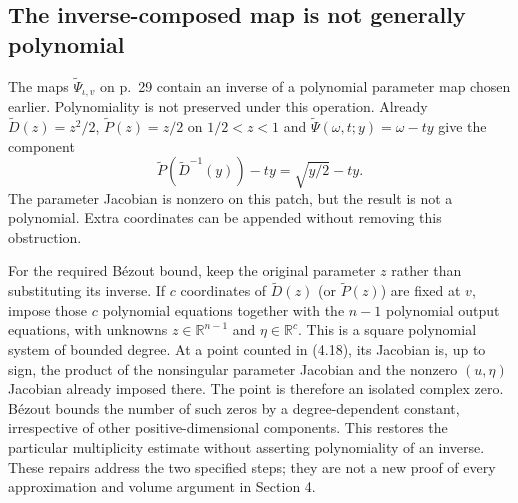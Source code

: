 \documentclass[10pt]{article}
\begin{document}
\subsection*{The inverse-composed map is not generally polynomial}
The maps \(\widetilde\Psi_{\iota,v}\) on p. 29 contain an inverse of a polynomial parameter map chosen earlier. Polynomiality is not preserved under this operation. Already \(\widetilde D(z)=z^2/2\), \(\widetilde P(z)=z/2\) on \(1/2<z<1\) and \(\widetilde\Psi(\omega,t;y)=\omega-ty\) give the component \[\widetilde P(\widetilde D^{-1}(y))-ty
 =\sqrt{y/2}-ty .\] The parameter Jacobian is nonzero on this patch, but the result is not a polynomial. Extra coordinates can be appended without removing this obstruction.\par
For the required Bézout bound, keep the original parameter \(z\) rather than substituting its inverse. If \(c\) coordinates of \(\widetilde D(z)\) (or \(\widetilde P(z)\)) are fixed at \(v\), impose those \(c\) polynomial equations together with the \(n-1\) polynomial output equations, with unknowns \(z\in\mathbb R^{n-1}\) and \(\eta\in\mathbb R^c\). This is a square polynomial system of bounded degree. At a point counted in (4.18), its Jacobian is, up to sign, the product of the nonsingular parameter Jacobian and the nonzero \((u,\eta)\) Jacobian already imposed there. The point is therefore an isolated complex zero. Bézout bounds the number of such zeros by a degree-dependent constant, irrespective of other positive-dimensional components. This restores the particular multiplicity estimate without asserting polynomiality of an inverse. These repairs address the two specified steps; they are not a new proof of every approximation and volume argument in Section 4.\par
\end{document}
